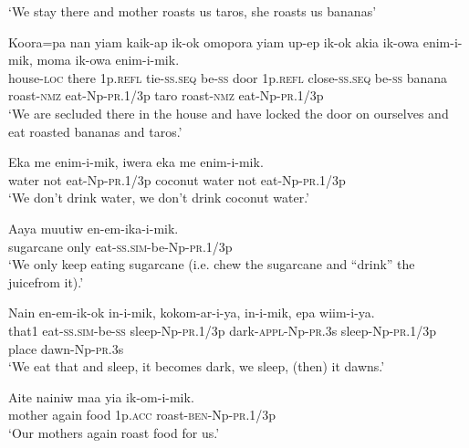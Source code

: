 \glt ‘We stay there and mother roasts us taros, she roasts us bananas’ \\
\z


\ea\label{ex:a:x4}
\gll  Koora=pa  nan  yiam  kaik-ap  ik-ok  omopora  yiam  up-ep           ik-ok  akia  ik-owa  enim-i-mik,  moma  ik-owa  enim-i-mik. \\
house-\textsc{loc}  there  1p.\textsc{refl}  tie-\textsc{ss.seq}  be-\textsc{ss}  door  1p.\textsc{refl}  close-\textsc{ss.seq} be-\textsc{ss}  banana  roast-\textsc{nmz}  eat-Np-\textsc{pr}.1/3p  taro  roast-\textsc{nmz}  eat-Np-\textsc{pr}.1/3p \\


\glt ‘We are secluded there in the house and have locked the door on ourselves and eat roasted bananas and taros.’ \\
\z


\ea\label{ex:a:x5}
\gll  Eka  me  enim-i-mik,  iwera  eka  me  enim-i-mik. \\
water  not  eat-Np-\textsc{pr}.1/3p  coconut  water  not  eat-Np-\textsc{pr}.1/3p \\
\glt ‘We don’t drink water, we don’t drink coconut water.’ \\
\z


\ea\label{ex:a:x6}
\gll  Aaya  muutiw  en-em-ika-i-mik. \\
sugarcane  only  eat-\textsc{ss}.\textsc{sim}-be-Np-\textsc{pr}.1/3p \\
\glt ‘We only keep eating sugarcane (i.e. chew the sugarcane and “drink” the juicefrom it).’ \\
\z


\ea\label{ex:a:x7}
\gll  Nain  en-em-ik-ok  in-i-mik,  kokom-ar-i-ya,            in-i-mik,  epa  wiim-i-ya. \\
that1  eat-\textsc{ss}.\textsc{sim}-be-\textsc{ss}  sleep-Np-\textsc{pr}.1/3p  dark-\textsc{appl}-Np-\textsc{pr}.3s sleep-Np-\textsc{pr}.1/3p  place  dawn-Np-\textsc{pr}.3s \\


\glt ‘We eat that and sleep, it becomes dark, we sleep, (then) it dawns.’ \\
\z


\ea\label{ex:a:x8}
\gll  Aite  nainiw  maa  yia  ik-om-i-mik. \\
mother  again  food  1p.\textsc{acc}  roast-\textsc{ben}-Np-\textsc{pr}.1/3p \\
\glt ‘Our mothers again roast food for us.’ \\
\z


